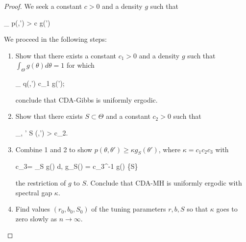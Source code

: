 \documentclass[twoside,11pt]{article}
\newcommand{\be}{\begin{equs}}
\newcommand{\ee}{\end{equs}}
\newcommand{\1}{\mathbf 1}
\begin{document}
{\begin{proof}
We seek a constant $c>0$ and a density $g$ such that
\be
\inf_{\theta \in \Theta} p(\theta,\theta') > c g(\theta')
\ee
% 

We proceed in the following steps:

\begin{enumerate}
	\item Show that there exists a constant $c_1 > 0$ and a density $g$ such that $\int_{\Theta} g(\theta) d\theta = 1$ for which
	\be
	\inf_{\theta \in \Theta} q(\theta,\theta') \ge c_1 g(\theta');
	\ee
	conclude that CDA-Gibbs is uniformly ergodic.
	\item Show that there exists $S \subset \Theta$ and a constant $c_2 > 0$ such that 
	\be
	\inf_{\theta \in \Theta, \theta' \in S} \alpha(\theta,\theta') > c_2.
	\ee    
	\item Combine 1 and 2 to show $p(\theta,\theta') \ge \kappa g_S(\theta')$, where $\kappa= c_1c_2c_3$ with 
	\be
	c_3= \int_S g(\theta) d\theta, \quad g_S(\theta) = c_3^{-1} g(\theta) \1\{\theta \in S\}  
	\ee
	the restriction of $g$ to $S$. Conclude that CDA-MH is uniformly ergodic with spectral gap $\kappa$.
	\item Find values ${(r_0,b_0,S_0)}$ of the tuning parameters $r,b,S$ so that $\kappa$ goes to zero slowly as $n \to \infty$. 
\end{enumerate}


\end{proof}}
\end{document}
